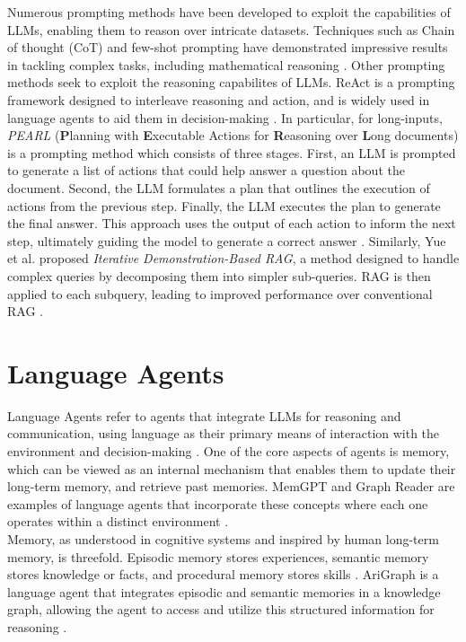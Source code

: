 Numerous prompting methods have been developed to exploit the capabilities of LLMs, enabling them to reason over intricate datasets. Techniques such as Chain of thought (CoT) and few-shot prompting have demonstrated impressive results in tackling complex tasks, including mathematical reasoning \cite{wei2023chainofthoughtpromptingelicitsreasoning}. Other prompting methods seek to exploit the reasoning capabilites of LLMs. ReAct is a prompting framework designed to interleave reasoning and action, and is widely used in language agents to aid them in decision-making \cite{yao2023react}. In particular, for long-inputs, \textit{PEARL} (\textbf{P}lanning with \textbf{E}xecutable Actions for \textbf{R}easoning over \textbf{L}ong documents) is a prompting method which consists of three stages. First, an LLM is prompted to generate a list of actions that could help answer a question about the document. Second, the LLM formulates a plan that outlines the execution of actions from the previous step. Finally, the LLM executes the plan to generate the final answer. This approach uses the output of each action to inform the next step, ultimately guiding the model to generate a correct answer \cite{sun-etal-2024-pearl}. Similarly, Yue et al. proposed \textit{Iterative Demonstration-Based RAG}, a method designed to handle complex queries by decomposing them into simpler sub-queries. RAG is then applied to each subquery, leading to improved performance over conventional RAG \cite{yue2024inferencescalinglongcontextretrieval}.

\section{Language Agents}

Language Agents refer to agents that integrate LLMs for reasoning and communication, using language as their primary means of interaction with the environment and decision-making \cite{language-agent-tutorial}. One of the core aspects of agents is memory, which can be viewed as an internal mechanism that enables them to update their long-term memory, and retrieve past memories. MemGPT and Graph Reader are examples of language agents that incorporate these concepts where each one operates within a distinct environment \cite{packer2024memgptllmsoperatingsystems}\cite{li2024graphreaderbuildinggraphbasedagent}.\\

\noindent Memory, as understood in cognitive systems and inspired by human long-term memory, is threefold. Episodic memory stores experiences, semantic memory stores knowledge or facts, and procedural memory stores skills \cite{sumers2024cognitive}. AriGraph is a language agent that integrates episodic and semantic memories in a knowledge graph, allowing the agent to access and utilize this structured information for reasoning \cite{anokhin2024arigraphlearningknowledgegraph}.

